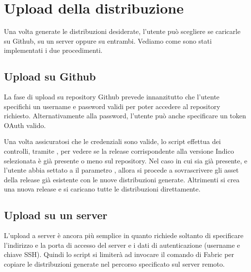     \section{Upload della distribuzione} \label{sec:dp;upload_distribuzione}
    
        Una volta generate le distribuzioni desiderate, l'utente può scegliere se caricarle su Github, su un server oppure su entrambi. Vediamo come sono stati implementati i due procedimenti.
        
        \subsection{Upload su Github} \label{subsec:dp;ud;upload_github}
        
            La fase di upload su repository Github prevede innanzitutto che l'utente specifichi un username e password validi per poter accedere al repository richiesto. Alternativamente alla password, l'utente può anche specificare un token OAuth valido.
            
            Una volta assicuratosi che le credenziali sono valide, lo script effettua dei controlli, tramite , per vedere se la release corrispondente alla versione Indico selezionata è già presente o meno sul repository. Nel caso in cui sia già presente, e l'utente abbia settato a  il parametro , allora si procede a sovrascrivere gli asset della release già esistente con le nuove distribuzioni generate. Altrimenti si crea una nuova release e si caricano tutte le distribuzioni direttamente.
        
        \subsection{Upload su un server} \label{subsec:dp;ud;upload_server}
        
            L'upload a server è ancora più semplice in quanto richiede soltanto di specificare l'indirizzo e la porta di accesso del server e i dati di autenticazione (username e chiave \ac{SSH}). Quindi lo script si limiterà ad invocare il comando  di Fabric per copiare le distribuzioni generate nel percorso specificato sul server remoto.

